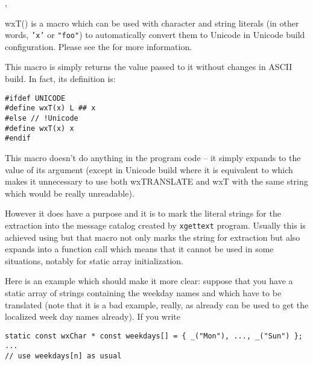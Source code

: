 
, 


\label{wxt}



wxT() is a macro which can be used with character and string literals (in other
words, {\tt 'x'} or {\tt "foo"}) to automatically convert them to Unicode in
Unicode build configuration. Please see the 
 for more information.

This macro is simply returns the value passed to it without changes in ASCII
build. In fact, its definition is:
\begin{verbatim}
#ifdef UNICODE
#define wxT(x) L ## x
#else // !Unicode
#define wxT(x) x
#endif
\end{verbatim}


\label{wxtranslate}


This macro doesn't do anything in the program code -- it simply expands to the
value of its argument (except in Unicode build where it is equivalent to 
 which makes it unnecessary to use both wxTRANSLATE and wxT
with the same string which would be really unreadable).

However it does have a purpose and it is to mark the literal strings for the
extraction into the message catalog created by {\tt xgettext} program. Usually
this is achieved using  but that macro not only marks
the string for extraction but also expands into a 
 function call which means that it
cannot be used in some situations, notably for static array
initialization.

Here is an example which should make it more clear: suppose that you have a
static array of strings containing the weekday names and which have to be
translated (note that it is a bad example, really, as 
 already can be used to get the localized week
day names already). If you write

\begin{verbatim}
static const wxChar * const weekdays[] = { _("Mon"), ..., _("Sun") };
...
// use weekdays[n] as usual
\end{verbatim}

